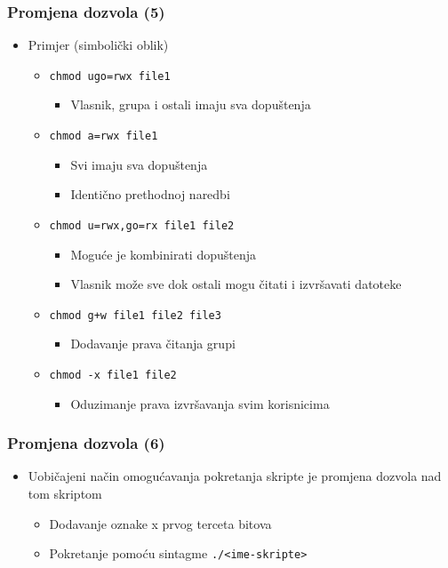 \documentclass[table,usenames,dvipsnames]{beamer}
\newcommand{\shell}[1]{\texttt{#1}}
\begin{document}
\begin{frame}[t]
\frametitle{Promjena dozvola (5)}
\begin{itemize}
  \item Primjer (simbolički oblik)
  \begin{itemize}
    \item[] \shell{chmod ugo=rwx file1}
    \begin{itemize}
      \item Vlasnik, grupa i ostali imaju sva dopuštenja
    \end{itemize}
    \item[] \shell{chmod a=rwx file1}
    \begin{itemize}
      \item Svi imaju sva dopuštenja
      \item Identično prethodnoj naredbi
    \end{itemize}
    \item[] \shell{chmod u=rwx,go=rx file1 file2}
    \begin{itemize}
      \item Moguće je kombinirati dopuštenja
      \item Vlasnik može sve dok ostali mogu čitati i izvršavati datoteke
    \end{itemize}
    \item[] \shell{chmod g+w file1 file2 file3}
    \begin{itemize}
      \item Dodavanje prava čitanja grupi
    \end{itemize}
    \item[] \shell{chmod -x file1 file2}
    \begin{itemize}
      \item Oduzimanje prava izvršavanja svim korisnicima
    \end{itemize}
  \end{itemize}
\end{itemize}
\end{frame}
   
\begin{frame}[t]
\frametitle{Promjena dozvola (6)}
\begin{itemize}
  \item Uobičajeni način omogućavanja pokretanja skripte je promjena dozvola nad tom skriptom
  \begin{itemize}
	\item Dodavanje oznake x prvog terceta bitova
	\item Pokretanje pomoću sintagme \shell{./<ime-skripte>}
  \end{itemize}
\end{itemize}
\end{frame}
\end{document}
